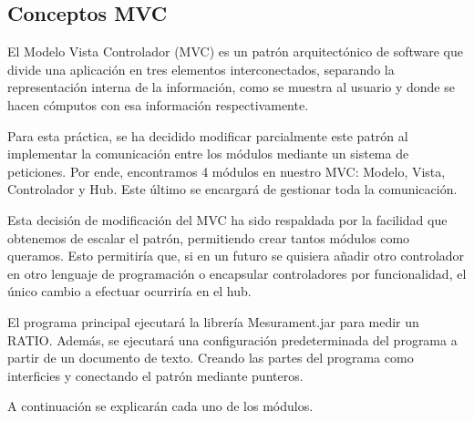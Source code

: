 \subsection{Conceptos MVC}

El Modelo Vista Controlador (MVC) es un patrón arquitectónico de software que divide una aplicación en tres elementos interconectados, separando la representación interna de la información, como se muestra al usuario y donde se hacen cómputos con esa información respectivamente. \bigskip

Para esta práctica, se ha decidido modificar parcialmente este patrón al implementar la comunicación entre los módulos mediante un sistema de peticiones. Por ende, encontramos 4 módulos en nuestro MVC: Modelo, Vista, Controlador y Hub. Este último se encargará de gestionar toda la comunicación. \bigskip

Esta decisión de modificación del MVC ha sido respaldada por la facilidad que obtenemos de escalar el patrón, permitiendo crear tantos módulos como queramos. Esto permitiría que, si en un futuro se quisiera añadir otro controlador en otro lenguaje de programación o encapsular controladores por funcionalidad, el único cambio a efectuar ocurriría en el hub.\bigskip

El programa principal ejecutará la librería Mesurament.jar para medir un RATIO. Además, se ejecutará una configuración predeterminada del programa a partir de un documento de texto. Creando las partes del programa como interficies y conectando el patrón mediante punteros. \bigskip

A continuación se explicarán cada uno de los módulos.





